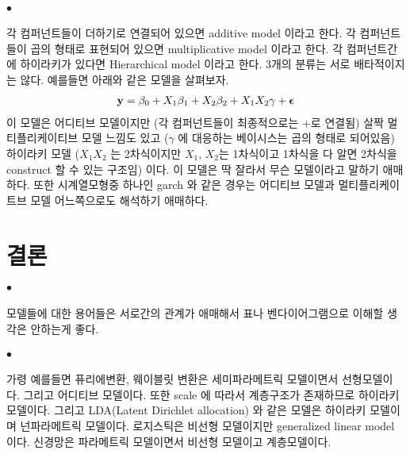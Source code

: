 \documentclass[12pt,oneside,english,a4paper]{article}
\def\ck{\paragraph{\Large$\bullet$}\Large}
\begin{document}
\ck 각 컴퍼넌트들이 더하기로 연결되어 있으면 additive model 이라고 한다. 각 컴퍼넌트들이 곱의 형태로 표현되어 있으면 multiplicative model 이라고 한다. 각 컴퍼넌트간에 하이라키가 있다면 Hierarchical model 이라고 한다. 3개의 분류는 서로 배타적이지는 않다. 예를들면 아래와 같은 모델을 살펴보자. 
\begin{align*}
{\bf y}=\beta_0+ X_1 \beta_1 + X_2 \beta_2 + X_1X_2 \gamma + \boldsymbol{\epsilon}
\end{align*}
이 모델은 어디티브 모델이지만 (각 컴퍼넌트들이 최종적으로는 +로 연결됨) 살짝 멀티플리케이티브 모델 느낌도 있고 ($\gamma$ 에 대응하는 베이시스는 곱의 형태로 되어있음) 하이라키 모델 ($X_1X_2$ 는 2차식이지만 $X_1$, $X_2$는 1차식이고 1차식을 다 알면 2차식을 construct 할 수 있는 구조임) 이다. 이 모델은 딱 잘라서 무슨 모델이라고 말하기 애매하다. 또한 시계열모형중 하나인 garch 와 같은 경우는 어디티브 모델과 멀티플리케이트브 모델 어느쪽으로도 해석하기 애매하다. 

\section{결론}

\ck 모델들에 대한 용어들은 서로간의 관계가 애매해서 표나 벤다이어그램으로 이해할 생각은 안하는게 좋다. 

\ck 가령 예를들면 퓨리에변환, 웨이블릿 변환은 세미파라메트릭 모델이면서 선형모델이다. 그리고 어디티브 모델이다. 또한 scale 에 따라서 계층구조가 존재하므로 하이라키 모델이다. 그리고 LDA(Latent Dirichlet allocation) 와 같은 모델은 하이라키 모델이며 넌파라메트릭 모델이다. 로지스틱은 비선형 모델이지만 generalized linear model 이다. 신경망은 파라메트릭 모델이면서 비선형 모델이고 계층모델이다. 
\end{document}
